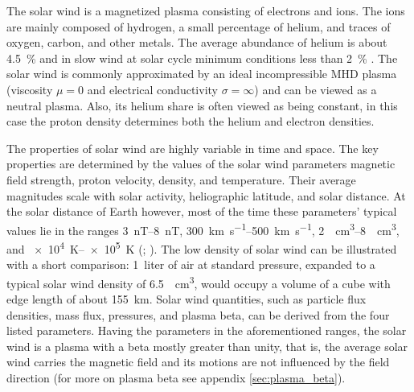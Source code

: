 The solar wind is a magnetized plasma consisting of electrons and ions. The ions are mainly composed of hydrogen, a small percentage of helium, and traces of oxygen, carbon, and other metals. The average abundance of helium is about \SI{4.5}{\%} and in slow wind at solar cycle minimum conditions less than \SI{2}{\%} \citep{Feldman1978,Schwenn1983,Kasper2012}.
The solar wind is commonly approximated by an ideal incompressible MHD plasma (viscosity $\mu = 0$ and electrical conductivity $\sigma = \infty$) and can be viewed as a neutral plasma. Also, its helium share is often viewed as being constant, in this case the proton density determines both the helium and electron densities.

The properties of solar wind are highly variable in time and space. The key properties are determined by the values of the solar wind parameters magnetic field strength, proton velocity, density, and temperature. Their average magnitudes scale with solar activity, heliographic latitude, and solar distance. At the solar distance of Earth however, most of the time these parameters' typical values lie in the ranges \SIrange{3}{8}{\nano\tesla}, \SIrange{300}{500}{\km\per\s}, \SIrange{2}{8}{\per\cm\cubed}, and \SIrange{e4}{e5}{\K} (\citealp[p.~92]{Kivelson1995}; \citealt{Venzmer2018}). The low density of solar wind can be illustrated with a short comparison: 1~liter of air at standard pressure, expanded to a typical solar wind density of \SI{6.5}{\per\cm\cubed}, would occupy a volume of a cube with edge length of about \SI{155}{\km}.
Solar wind quantities, such as particle flux densities, mass flux, pressures, and plasma beta, can be derived from the four listed parameters. Having the parameters in the aforementioned ranges, the solar wind is a plasma with a beta mostly greater than unity, that is, the average solar wind carries the magnetic field and its motions are not influenced by the field direction (for more on plasma beta see appendix \autoref{sec:plasma_beta}).

